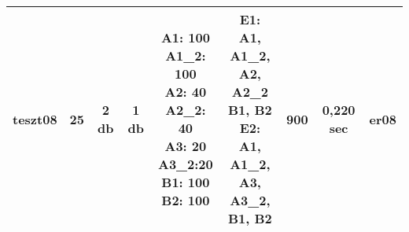 \begin{table}
\begin{center}
\begin{sideways}
\begin{tabular}{|c|c|c|c|c|c|c|c|c|}
		\hline	
		teszt08 & 25 & 2 db & 1 db & \makecell{A1: 100 \\ A1\_2: 100\\A2: 40\\A2\_2: 40\\A3: 20\\A3\_2:20\\B1: 100\\B2: 100} & \makecell{E1: A1, A1\_2,\\A2, A2\_2 \\B1, B2 \\E2: A1, A1\_2,\\ A3, A3\_2, \\ B1, B2} & 900 & 0,220 sec & er08 \\
		\hline	
		\end{tabular}
	\end{sideways}
	\end{center}
\end{table}